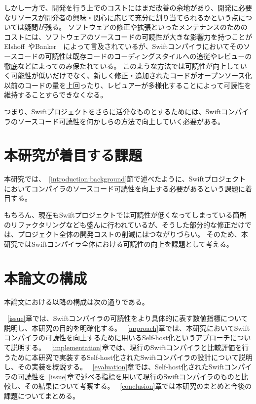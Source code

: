 しかし一方で、開発を行う上でのコストにはまだ改善の余地があり、開発に必要なリソースが開発者の興味・関心に応じて充分に割り当てられるかという点については疑問が残る。
ソフトウェアの修正や拡張といったメンテナンスのためのコストには、ソフトウェアのソースコードの可読性が大きな影響力を持つことがElshoff~\cite{elshoff}やBanker~\cite{banker-datar}~\cite{banker-davis}によって言及されているが、Swiftコンパイラにおいてそのソースコードの可読性は既存コードのコーディングスタイルへの追従やレビューの徹底などによってのみ保たれている。
このような方法では可読性が向上していく可能性が低いだけでなく、新しく修正・追加されたコードがオープンソース化以前のコードの量を上回ったり、レビュアーが多様化することによって可読性を維持することすらできなくなる。

つまり、Swiftプロジェクトをさらに活発なものとするためには、Swiftコンパイラのソースコード可読性を何かしらの方法で向上していく必要がある。

\section{本研究が着目する課題}
\label{introduction:issue}

本研究では、~\ref{introduction:background}節で述べたように、Swiftプロジェクトにおいてコンパイラのソースコード可読性を向上する必要があるという課題に着目する。

もちろん、現在もSwiftプロジェクトでは可読性が低くなってしまっている箇所のリファクタリングなども盛んに行われているが、そうした部分的な修正だけでは、プロジェクト全体の開発コストの削減にはつながりづらい。
そのため、本研究ではSwiftコンパイラ全体における可読性の向上を課題として考える。

\section{本論文の構成}

本論文における以降の構成は次の通りである。

~\ref{issue}章では、Swiftコンパイラの可読性をより具体的に表す数値指標について説明し、本研究の目的を明確化する。
~\ref{approach}章では、本研究においてSwiftコンパイラの可読性を向上するために用いるSelf-host化というアプローチについて説明する。
~\ref{implementation}章では、現行のSwiftコンパイラと比較評価を行うために本研究で実装するSelf-host化されたSwiftコンパイラの設計について説明し、その実装を概説する。
~\ref{evaluation}章では、Self-host化されたSwiftコンパイラの可読性を~\ref{issue}章で述べる指標を用いて現行のSwiftコンパイラのものと比較し、その結果について考察する。
~\ref{conclusion}章では本研究のまとめと今後の課題についてまとめる。

